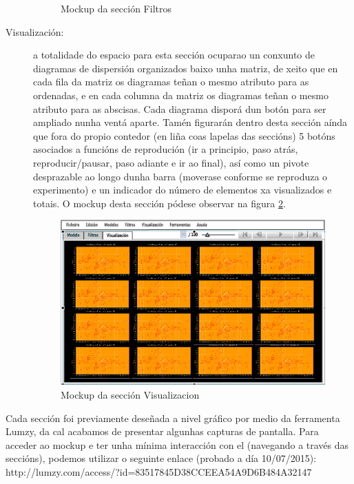 \begin{description}
\begin{figure}
\caption{Mockup da sección Filtros}
\label{Filtros}
\end{figure}
\item[Visualización:] \hfill
a totalidade do espacio para esta sección ocuparao un conxunto de diagramas de dispersión organizados baixo unha matriz, de xeito que en cada fila da matriz os diagramas teñan o mesmo atributo para as ordenadas, e en cada columna da matriz os diagramas teñan o mesmo atributo para as abscisas. Cada diagrama disporá dun botón para ser ampliado nunha ventá aparte. Tamén figurarán dentro desta sección aínda que fora do propio contedor (en liña coas lapelas das seccións) 5 botóns asociados a funcións de reprodución (ir a principio, paso atrás, reproducir/pausar, paso adiante e ir ao final), así como un pivote desprazable ao longo dunha barra (moverase conforme se reproduza o experimento) e un indicador do número de elementos xa visualizados e totais. O mockup desta sección pódese observar na figura \ref{Visualizacion}.
\begin{figure}
\centering
\includegraphics[width=\textwidth,height=\textheight,keepaspectratio]{figuras/Visualizacion}
\caption{Mockup da sección Visualizacion}
\label{Visualizacion}
\end{figure}
\end{description} 

Cada sección foi previamente deseñada a nivel gráfico por medio da ferramenta Lumzy, da cal acabamos de presentar algunhas capturas de pantalla. Para acceder ao mockup e ter unha mínima interacción con el (navegando a través das seccións), podemos utilizar o seguinte enlace (probado a día 10/07/2015):
\\
http://lumzy.com/access/?id=83517845D38CCEEA54A9D6B484A32147

